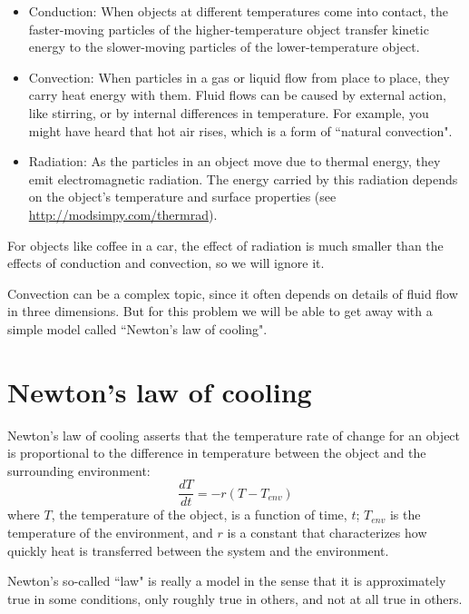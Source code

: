 \documentclass[12pt]{book}
\theoremstyle{exercise}
\begin{document}
\begin{itemize}

\item Conduction: When objects at different temperatures come into contact, the faster-moving particles of the higher-temperature object transfer kinetic energy to the slower-moving particles of the lower-temperature object.

\item Convection: When particles in a gas or liquid flow from place to place, they carry heat energy with them.  Fluid flows can be caused by external action, like stirring, or by internal differences in temperature.  For example, you might have heard that hot air rises, which is a form of ``natural convection".


\item Radiation: As the particles in an object move due to thermal energy, they emit electromagnetic radiation.  The energy carried by this radiation depends on the object's temperature and surface properties (see \url{http://modsimpy.com/thermrad}).

\end{itemize}

For objects like coffee in a car, the effect of radiation is much smaller than 
the effects of conduction and convection, so we will ignore it.

Convection can be a complex topic, since it often depends on details of fluid flow in three dimensions.  But for this problem we will be able to get away with a simple model called ``Newton's law of cooling".


\section{Newton's law of cooling}

Newton's law of cooling asserts that the temperature rate of change for an object is proportional to the difference in temperature between the object and the surrounding environment:
%
\[ \frac{dT}{dt} = -r (T - T_{env}) \]
%
where $T$, the temperature of the object, is a function of time, $t$; $T_{env}$ is the temperature of the environment, and $r$ is a constant that characterizes how quickly heat is transferred between the system and the environment.

Newton's so-called ``law" is really a model in the sense that it is approximately true in some conditions, only roughly true in others, and not at all true in others.
\end{document}
